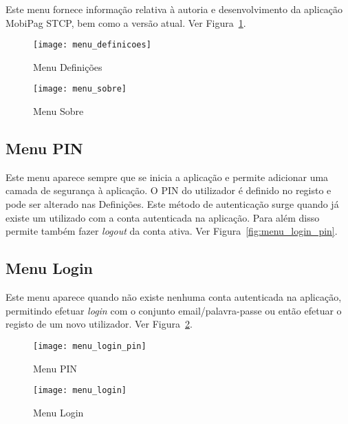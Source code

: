 Este menu fornece informação relativa à autoria e desenvolvimento da aplicação MobiPag STCP, bem como a versão atual. Ver Figura~\ref{fig:menu_sobre}.

\begin{figure}[ht]
\begin{minipage}[b]{0.45\linewidth}
\centering
\texttt{[image: menu\_definicoes]}
    \caption{Menu Definições}
    \label{fig:menu_definicoes}
\end{minipage}
\hspace{0.5cm}
\begin{minipage}[b]{0.45\linewidth}
\centering
    \texttt{[image: menu\_sobre]}
    \caption{Menu Sobre}
    \label{fig:menu_sobre}
\end{minipage}
\end{figure}

\subsection{Menu PIN}

Este menu aparece sempre que se inicia a aplicação e permite adicionar uma camada de segurança à aplicação. O PIN do utilizador é definido no registo e pode ser alterado nas Definições. Este método de autenticação surge quando já existe um utilizado com a conta autenticada na aplicação. Para além disso permite também fazer \emph{logout} da conta ativa. Ver Figura~\ref{fig:menu_login_pin}.

\subsection{Menu Login}

Este menu aparece quando não existe nenhuma conta autenticada na aplicação, permitindo efetuar \emph{login} com o conjunto email/palavra-passe ou então efetuar o registo de um novo utilizador. Ver Figura~\ref{fig:menu_login}.

\begin{figure}[ht]
\begin{minipage}[b]{0.45\linewidth}
\centering
\texttt{[image: menu\_login\_pin]}
    \caption{Menu PIN}
    \label{fig:menu_login_pin}
\end{minipage}
\hspace{0.5cm}
\begin{minipage}[b]{0.45\linewidth}
\centering
    \texttt{[image: menu\_login]}
    \caption{Menu Login}
    \label{fig:menu_login}
\end{minipage}
\end{figure}

